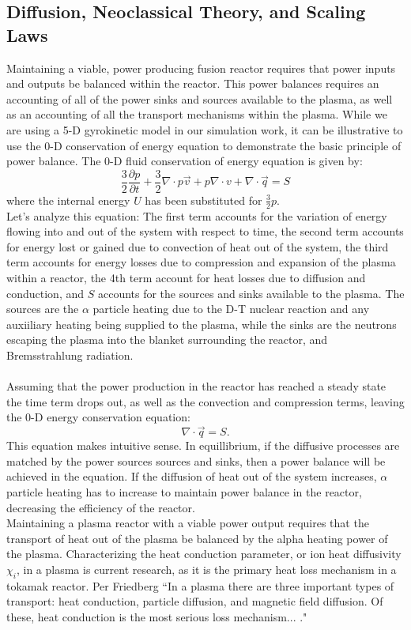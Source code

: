\documentclass{article}
\begin{document}
\subsection{Diffusion, Neoclassical Theory, and Scaling Laws}
Maintaining a viable, power producing fusion reactor requires that power inputs and outputs be balanced within the reactor.
 This power balances requires an accounting of all of the power sinks and sources available to the plasma, as well as an accounting of all the transport mechanisms within the plasma. 
While we are using a 5-D gyrokinetic model in our simulation work, it can be illustrative to use the 0-D conservation of energy equation to demonstrate the basic principle of power balance. 
The 0-D fluid conservation of energy equation is given by:
$$
\frac{3}{2}\frac{\partial p}{\partial t} + \frac{3}{2}\nabla \cdot p \vec{v} + p\nabla \cdot v + \nabla\cdot \vec{q} = S
$$
where the internal energy $U$ has been substituted for $\frac{3}{2}p$\cite{J_Friedberg:1}.\\
Let's analyze this equation: The first term accounts for the variation of energy flowing into and out of the system with respect to time, the second term accounts for energy lost or gained due to convection of heat out of the system, the third term accounts for energy losses due to compression and expansion of the plasma within a reactor, the 4th term account for heat losses due to diffusion and conduction, and $S$ accounts for the sources and sinks available to the plasma. The sources are the $\alpha$ particle heating due to the D-T nuclear reaction and any auxiiliary heating being supplied to the plasma, while the sinks are the neutrons escaping the plasma into the blanket surrounding the reactor, and Bremsstrahlung radiation.\\
\\
Assuming that the power production in the reactor has reached a steady state the time term drops out, as well as the convection and compression terms, leaving the 0-D energy conservation equation:
$$
\nabla\cdot \vec{q} = S.
$$
This equation makes intuitive sense. In equillibrium, if the diffusive processes are matched by the power sources sources and sinks, then a power balance will be achieved in the equation. If the diffusion of heat out of the system increases,  $\alpha$ particle heating has to increase to maintain power balance in the reactor, decreasing the efficiency of the reactor. \\ %
Maintaining a plasma reactor with a viable power output requires that the transport of heat out of the plasma be balanced by the alpha heating power of the plasma. Characterizing the heat conduction parameter, or ion heat diffusivity $\chi_i$, in a plasma is current research, \cite{Yas_Ido} \cite{choong-seock_chang_et_al_partnership_2017} as it is the primary heat loss mechanism in a tokamak reactor. Per Friedberg “In a plasma there are three important types of transport: heat conduction, particle diffusion, and magnetic ﬁeld diffusion. Of these, heat conduction is the most serious loss mechanism... \cite{J_Friedberg:1}." \\
\end{document}
